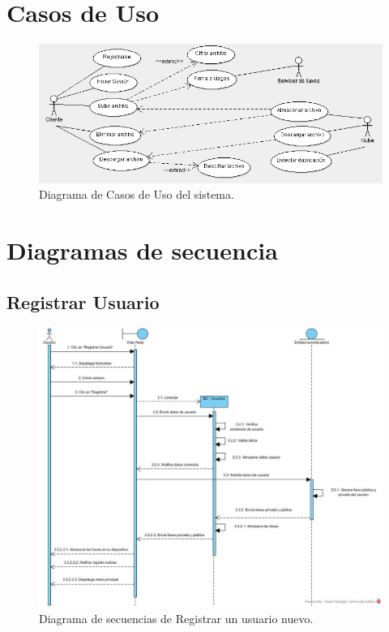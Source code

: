 \newpage
\section{Casos de Uso}

\begin{figure}[htbp!]
		\centering
			\includegraphics[width=1\textwidth]{images/CasosDeUso}
		\caption{Diagrama de Casos de Uso del sistema.}
	\end{figure}

\newpage
\section{Diagramas de secuencia}

\subsection{Registrar Usuario}

\begin{figure}[htbp!]
		\centering
			\includegraphics[width=1\textwidth]{images/Registrar_usuario}
		\caption{Diagrama de secuencias de Registrar un usuario nuevo.}
\end{figure}

